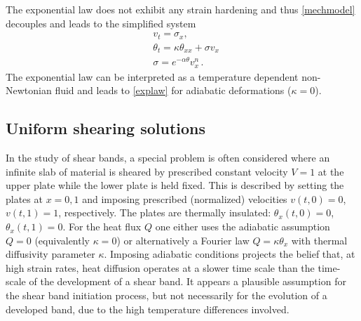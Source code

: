 \documentclass[usletter,11pt]{article}
\newcommand{\ga}{\alpha}
\theoremstyle{remark}
\begin{document}
The exponential law does not exhibit any strain hardening and thus \eqref{mechmodel} decouples and
leads to the simplified system
\begin{equation}
  \label{ARS}
  \begin{aligned}
    & v_{t} = \sigma_{x},\\
    & \theta_{t} = \kappa \theta_{ x x}  +  \sigma v_x \\
    & \sigma  = e^{-\ga\theta} v_x^n \, .
  \end{aligned}
\end{equation}
The exponential law  can be interpreted as a temperature dependent non-Newtonian fluid and leads to \eqref{explaw} for adiabatic deformations ($\kappa =0$).



\subsection{Uniform shearing solutions} \label{sec:uss}

In the study of shear bands,  a special problem is often considered  where an infinite slab of material
is  sheared by prescribed constant velocity $V=1$ at the upper plate while the lower plate is held fixed.
This is described by setting the plates at $x=0, 1$ and imposing prescribed (normalized) velocities $v(t,0) = 0$,  $v(t,1) = 1$, respectively.
The plates are thermally insulated:  $ \theta_{x}(t,0) = 0$,  $\theta_{x}(t,1) = 0$.
For the heat flux $Q$ one either uses the adiabatic assumption $Q = 0$ (equivalently $\kappa = 0$)
or alternatively a Fourier  law $Q = \kappa \theta_{x}$ with thermal diffusivity
parameter $\kappa$.
Imposing adiabatic conditions projects the belief that, at high strain rates,
heat diffusion operates at a slower time scale than the time-scale of the development 
of a shear band. It appears a plausible assumption for the shear band initiation process, 
but not necessarily for the evolution of a developed band,
 due to the high temperature differences involved.
 
\end{document}
